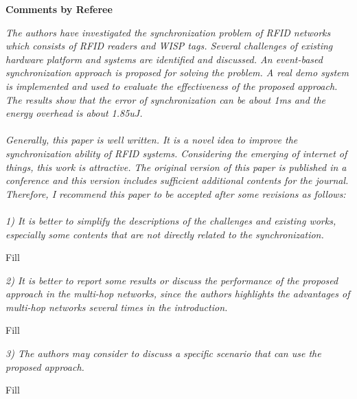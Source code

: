 \documentclass[10pt]{article}
\newcommand{\referee}[1]{
	{\item \color{OliveGreen} \emph{{#1}}}
	\label{R\therefereeCounter:\arabic{enumi}}
}
\newcommand{\response}[1]{{\color{blue} #1}}
\newcounter{refereeCounter}
\newenvironment{responses}{%
\refstepcounter{refereeCounter}%
\textbf{\large Comments by Referee \therefereeCounter}
\begin{enumerate}%
\renewcommand{\labelenumi}{\textbf{[R\therefereeCounter :\,\arabic{enumi}]}} %
}{\end{enumerate}}
\begin{document}
\begin{responses}
	
\referee{The authors have investigated the synchronization problem of RFID networks which consists of RFID readers and WISP tags. Several challenges of existing hardware platform and systems are identified and discussed. An event-based synchronization approach is proposed for solving the problem. A real demo system is implemented and used to evaluate the effectiveness of the proposed approach. The results show that the error of synchronization can be about 1ms and the energy overhead is about 1.85uJ. \\
\\
Generally, this paper is well written. It is a novel idea to improve the synchronization ability of RFID systems. Considering the emerging of internet of things, this work  is attractive.  The original version of this paper is published in a conference and this version includes sufficient additional contents for the journal. Therefore, I recommend this paper to be accepted after some revisions as follows:  \\
\\
1) It is better to simplify the descriptions of the challenges and existing works, especially some contents that are not directly related to the synchronization.}
	
\response{
	Fill
}

\referee{2) It is better to report some results or discuss the performance of the proposed approach in the multi-hop networks, since the authors highlights the advantages of  multi-hop networks several times in the introduction.}
	
\response{
	Fill
}
	
\referee{3) The authors may consider to discuss a specific scenario that can use the proposed approach.}
	
\response{
	Fill
}

\end{responses}
\end{document}
